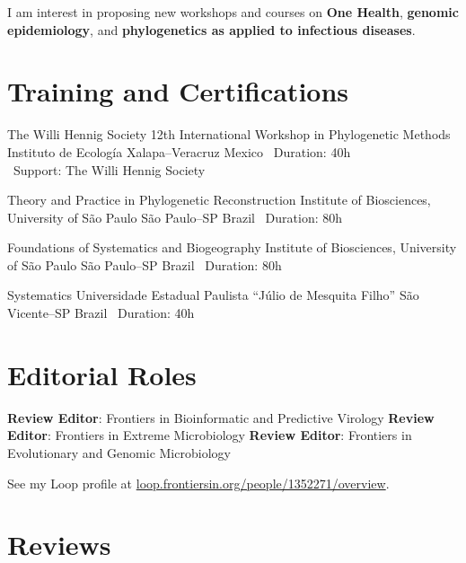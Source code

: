 \documentclass[11pt, letterpaper, sans]{moderncv}
\begin{document}
\vspace{0.5em}

I am interest in proposing new workshops and courses on \textbf{One Health}, \textbf{genomic epidemiology}, and \textbf{phylogenetics as applied to infectious diseases}.


\section{Training and Certifications}
		{The Willi Hennig Society 12th International Workshop in Phylogenetic Methods}
		{Instituto de Ecología}
		{Xalapa--Veracruz}
		{Mexico}
		{
			\textbullet~Duration: 40h\\
			\textbullet~Support: The Willi Hennig Society
		}

		{Theory and Practice in Phylogenetic Reconstruction}
		{Institute of Biosciences, University of São Paulo}
		{São Paulo--SP}
		{Brazil}
		{
			\textbullet~Duration: 80h
		}

		{Foundations of Systematics and Biogeography}
		{Institute of Biosciences, University of São Paulo}
		{São Paulo--SP}
		{Brazil}
		{
			\textbullet~Duration: 80h
		}

		{Systematics}
		{Universidade Estadual Paulista ``Júlio de Mesquita Filho''}
		{São Vicente--SP}
		{Brazil}
		{
			\textbullet~Duration: 40h
		}


\section{Editorial Roles}

	    {\textbf{Review Editor}: Frontiers in Bioinformatic and Predictive Virology}
	\cvline{---}
	    {\textbf{Review Editor}: Frontiers in Extreme Microbiology}
	\cvline{---}
	    {\textbf{Review Editor}: Frontiers in Evolutionary and Genomic Microbiology}

\vspace{0.5em}

See my Loop profile at  \href{https://loop.frontiersin.org/people/1352271/overview}{loop.frontiersin.org/people/1352271/overview}.

\section{Reviews}
\end{document}
